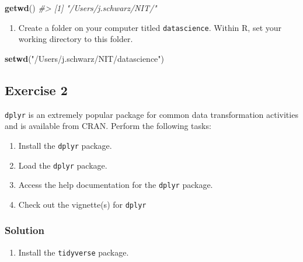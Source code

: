 \documentclass[]{article}
\newenvironment{Shaded}{\begin{snugshade}}{\end{snugshade}}
\newcommand{\CommentTok}[1]{\textcolor[rgb]{0.56,0.35,0.01}{\textit{#1}}}
\newcommand{\KeywordTok}[1]{\textcolor[rgb]{0.13,0.29,0.53}{\textbf{#1}}}
\newcommand{\NormalTok}[1]{#1}
\newcommand{\StringTok}[1]{\textcolor[rgb]{0.31,0.60,0.02}{#1}}
\providecommand{\tightlist}{%
  \setlength{\itemsep}{0pt}\setlength{\parskip}{0pt}}
\begin{document}
\begin{Shaded}
\begin{Highlighting}[]
\KeywordTok{getwd}\NormalTok{()}
\CommentTok{#> [1] "/Users/j.schwarz/NIT/"}
\end{Highlighting}
\end{Shaded}

\begin{enumerate}
\def\labelenumi{\arabic{enumi}.}
\setcounter{enumi}{1}
\tightlist
\item
  Create a folder on your computer titled \texttt{datascience}. Within R, set your working directory to this folder.
\end{enumerate}

\begin{Shaded}
\begin{Highlighting}[]
\KeywordTok{setwd}\NormalTok{(}\StringTok{"/Users/j.schwarz/NIT/datascience"}\NormalTok{)}
\end{Highlighting}
\end{Shaded}

\hypertarget{exercise-2}{%
\subsection{ Exercise 2}\label{exercise-2}}

\texttt{dplyr} is an extremely popular package for common data transformation activities and is available from CRAN. Perform the following tasks:

\begin{enumerate}
\def\labelenumi{\arabic{enumi}.}
\tightlist
\item
  Install the \texttt{dplyr} package.
\item
  Load the \texttt{dplyr} package.
\item
  Access the help documentation for the \texttt{dplyr} package.
\item
  Check out the vignette(s) for \texttt{dplyr}
\end{enumerate}

\hypertarget{solution-1}{%
\subsubsection*{Solution}\label{solution-1}}

\begin{enumerate}
\def\labelenumi{\arabic{enumi}.}
\tightlist
\item
  Install the \texttt{tidyverse} package.
\end{enumerate}
\end{document}
